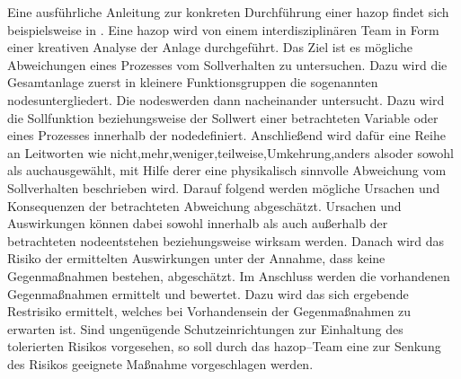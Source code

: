 Eine ausf\"uhrliche Anleitung zur konkreten Durchf\"uhrung einer \ac{hazop} findet sich beispielsweise in  \cite{Crawley_2015}. \newline
Eine \ac{hazop} wird von einem interdisziplin\"aren Team in Form einer kreativen Analyse der Anlage durchgef\"uhrt. Das Ziel ist es m\"ogliche Abweichungen eines Prozesses vom Sollverhalten zu untersuchen. Dazu wird die Gesamtanlage zuerst in kleinere Funktionsgruppen die sogenannten \glqq nodes\grqq { }untergliedert. Die \glqq nodes\grqq { }werden dann nacheinander untersucht. Dazu wird die Sollfunktion beziehungsweise der Sollwert einer betrachteten Variable oder eines Prozesses innerhalb der \glqq node\grqq { }definiert. Anschlie\ss{}end wird daf\"ur eine Reihe an Leitworten wie  nicht\grqq { },\glqq mehr\grqq { },\glqq weniger\grqq { },\glqq teilweise\grqq { },\glqq Umkehrung\grqq { },\glqq anders als\grqq { }oder \glqq sowohl als auch\grqq { }ausgew\"ahlt, mit Hilfe derer eine physikalisch sinnvolle Abweichung vom Sollverhalten beschrieben wird. Darauf folgend werden m\"ogliche Ursachen und Konsequenzen der betrachteten Abweichung abgesch\"atzt. Ursachen und Auswirkungen k\"onnen dabei sowohl innerhalb als auch au\ss{}erhalb der betrachteten \glqq node\grqq { }entstehen beziehungsweise wirksam werden. Danach wird das Risiko der ermittelten Auswirkungen unter der Annahme, dass keine Gegenma\ss{}nahmen bestehen, abgesch\"atzt. Im Anschluss werden die vorhandenen Gegenma\ss{}nahmen ermittelt und bewertet. Dazu wird das sich ergebende Restrisiko ermittelt, welches bei Vorhandensein der Gegenma\ss{}nahmen zu erwarten ist. Sind ungen\"ugende Schutzeinrichtungen zur Einhaltung des tolerierten Risikos vorgesehen, so soll durch das \ac{hazop}--Team eine zur Senkung des Risikos geeignete Ma\ss{}nahme vorgeschlagen werden.

